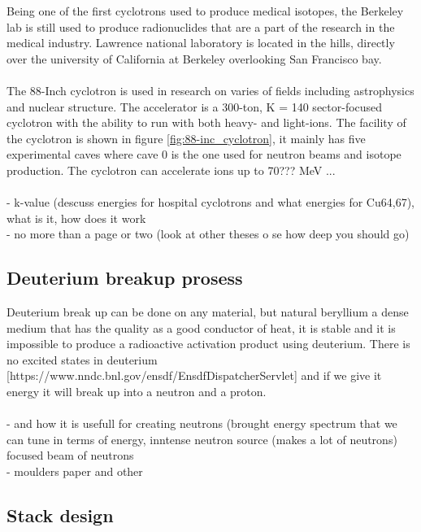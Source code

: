 \documentclass[twoside,english]{uiofysmaster/uiofysmaster}
\begin{document}
Being one of the first cyclotrons used to produce medical isotopes, the Berkeley lab is still used to produce radionuclides that are a part of the research in the medical industry. Lawrence national laboratory is located in the hills, directly over the university of California at Berkeley overlooking San Francisco bay.\\
\\
The 88-Inch cyclotron is used in research on varies of fields including astrophysics and nuclear structure. The accelerator is a 300-ton, K = 140 sector-focused cyclotron with the ability to run with both heavy- and light-ions. The facility of the cyclotron is shown in figure \ref{fig:88-inc_cyclotron}, it mainly has five experimental caves where cave 0 is the one used for neutron beams and isotope production. The cyclotron can accelerate ions up to 70??? MeV  ...
\\
\\
- k-value (descuss energies for hospital cyclotrons and what energies for Cu64,67), what is it, how does it work\\
- no more than a page or two (look at other theses o se how deep you should go)

\subsection{Deuterium breakup prosess}
\label{sec: D_breakup}

Deuterium break up can be done on any material, but natural beryllium a dense medium that has the quality as a good conductor of heat, it is stable and it is impossible to produce a radioactive activation product using deuterium. There is no excited states in deuterium [https://www.nndc.bnl.gov/ensdf/EnsdfDispatcherServlet] and if we give it energy it will break up into a neutron and a proton.
\\
\\
- and how it is usefull for creating neutrons (brought energy spectrum that we can tune in terms of energy, inntense neutron source (makes a lot of neutrons) focused beam of neutrons \\
- moulders paper and other



\subsection{Stack design}
\label{sec: stack_design}
\end{document}
